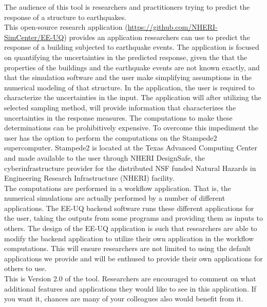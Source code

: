 The audience of this tool is researchers and practitioners trying to
predict the response of a structure to earthquakes.\\

This open-source research application
(\href{https://github.com/NHERI-SimCenter/EE-UQ}{https://github.com/NHERI-SimCenter/EE-UQ})
provides an application researchers can use to predict the response of
a building subjected to earthquake events. The application is focused
on quantifying the uncertainties in the predicted response, given the
that the properties of the buildings and the earthquake events are not
known exactly, and that the simulation software and the user make
simplifying assumptions in the numerical modeling of that
structure. In the application, the user is required to characterize
the uncertainties in the input. The application will after utilizing
the selected sampling method, will provide information that
characterizes the uncertainties in the response measures. The
computations to make these determinations can be prohibitively
expensive. To overcome this impediment the user has the option to
perform the computations on the Stampede2 supercomputer. Stampede2 is
located at the Texas Advanced Computing Center and made available to
the user through NHERI DesignSafe, the cyberinfrastructure provider
for the distributed NSF funded Natural Hazards in Engineering Research
Infrastructure (NHERI) facility.\\

The computations are performed in a workflow application. That is, the
numerical simulations are actually performed by a number of different
applications. The EE-UQ backend software runs these different
applications for the user, taking the outputs from some programs and
providing them as inputs to others. The design of the EE-UQ
application is such that researchers are able to modify the backend
application to utilize their own application in the workflow
computations. This will ensure researchers are not limited to using
the default applications we provide and will be enthused to provide
their own applications for others to use. \\

This is Version 2.0 of the tool. Researchers are encouraged to comment on what additional
features and applications they would like to see in this
application. If you want it, chances are many of your colleagues also
would benefit from it.\\
\\

